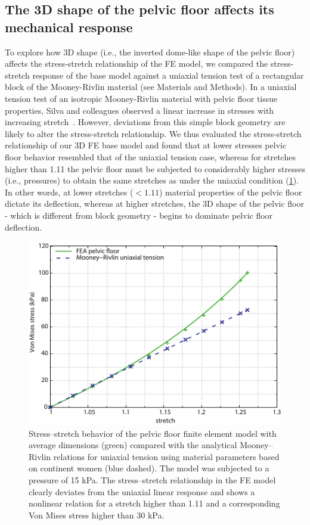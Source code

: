 \documentclass[9pt,twocolumn,twoside]{pnas-new}
\begin{document}
\subsection*{The 3D shape of the pelvic floor affects its mechanical response}
To explore how 3D shape (i.e., the inverted dome-like shape of the pelvic floor) affects the stress-stretch relationship of the FE model, we compared the stress-stretch response of the base model against a uniaxial tension test of a rectangular block of the Mooney-Rivlin material (see Materials and Methods). In a uniaxial tension test of an isotropic Mooney-Rivlin material with pelvic floor tissue properties, Silva and colleagues observed a linear increase in stresses with increasing stretch~\cite{Silva2017-uz}. However, deviations from this simple block geometry are likely to alter the stress-stretch relationship. We thus evaluated the stress-stretch relationship of our 3D FE base model and found that at lower stresses pelvic floor behavior resembled that of the uniaxial tension case, whereas for stretches higher than 1.11 the pelvic floor must be subjected to considerably higher stresses (i.e., pressures) to obtain the same stretches as under the uniaxial condition (\cref{fig:stress-strain}). In other words, at lower stretches ($<1.11$) material properties of the pelvic floor dictate its deflection, whereas at higher stretches, the 3D shape of the pelvic floor - which is different from block geometry - begins to dominate pelvic floor deflection.

\begin{figure}
\centering
\includegraphics[width=\linewidth]{figs/fig5}
\caption{Stress–stretch behavior of the pelvic floor finite element model with
average dimensions (green) compared with the analytical Mooney–Rivlin
relations for uniaxial tension using material parameters based on continent
women (blue dashed). The model was subjected to a pressure of 15 kPa. The
stress–stretch relationship in the FE model clearly deviates from the uniaxial
linear response and shows a nonlinear relation for a stretch higher than 1.11
and a corresponding Von Mises stress higher than 30 kPa.}
\label{fig:stress-strain}
\end{figure}
\end{document}
